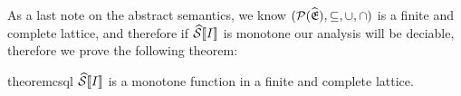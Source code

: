 As a last note on the abstract semantics, we know $(\mathcal{P}(\widehat{\mathfrak{E}}), \subseteq, \cup, \cap)$ is a finite and complete lattice, and therefore if $\widehat{\mathcal{S}} \llbracket I \rrbracket$ is monotone our analysis will be deciable, therefore we prove the following theorem:
\begin{restatable}{theorem}{csql}\label{thm:csql}
    $\widehat{\mathcal{S}} \llbracket I \rrbracket$ is a monotone function in a finite and complete lattice.
\end{restatable}

%
%
%
